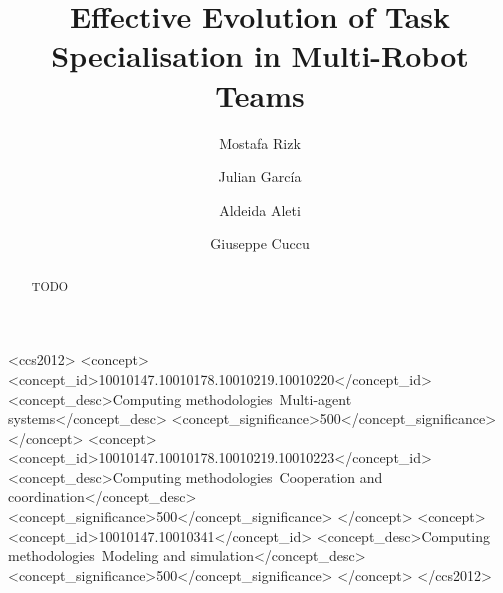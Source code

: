 \documentclass[sigconf]{aamas}  %
\begin{document}
\title{Effective Evolution of Task Specialisation in Multi-Robot Teams}  

 \author{Mostafa Rizk}

 \author{Julian Garc\'ia}

 \author{Aldeida Aleti}
 
  \author{Giuseppe Cuccu}



\begin{abstract}  %

TODO

\end{abstract}


\begin{CCSXML}
<ccs2012>
<concept>
<concept_id>10010147.10010178.10010219.10010220</concept_id>
<concept_desc>Computing methodologies~Multi-agent systems</concept_desc>
<concept_significance>500</concept_significance>
</concept>
<concept>
<concept_id>10010147.10010178.10010219.10010223</concept_id>
<concept_desc>Computing methodologies~Cooperation and coordination</concept_desc>
<concept_significance>500</concept_significance>
</concept>
<concept>
<concept_id>10010147.10010341</concept_id>
<concept_desc>Computing methodologies~Modeling and simulation</concept_desc>
<concept_significance>500</concept_significance>
</concept>
</ccs2012>
\end{CCSXML}

\end{document}
